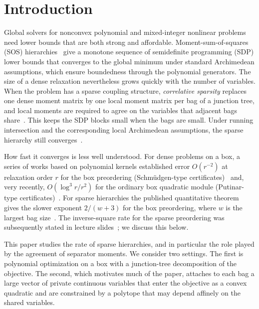 \section{Introduction}\label{sec:introduction}

Global solvers for nonconvex polynomial and mixed-integer nonlinear problems
need lower bounds that are both strong and affordable. Moment-sum-of-squares
(SOS) hierarchies~\cite{lasserre2001-global-optimization-with-polynomials-and,parrilo2003-semidefinite-programming-relaxations-for-semialgebraic}
give a monotone sequence of semidefinite programming (SDP) lower bounds that
converges to the global minimum under standard Archimedean assumptions,
which ensure boundedness through the polynomial generators. The size of a
dense relaxation nevertheless grows quickly with the number of variables.
When the problem has a sparse coupling structure, \emph{correlative sparsity} replaces one dense
moment matrix by one local moment matrix per bag of a junction tree, and
local moments are required to agree on the variables that adjacent bags
share~\cite{waki2006-sums-of-squares-and-semidefinite,lasserre2006-convergent-sdprelaxations-in-polynomial-optimization}.
This keeps the SDP blocks small when the bags are small. Under running
intersection and the corresponding local Archimedean assumptions, the sparse
hierarchy still converges~\cite{lasserre2006-convergent-sdprelaxations-in-polynomial-optimization,grimm2007-structured-sparsity}.

How fast it converges is less well understood. For dense problems on a
box, a series of works based on polynomial kernels established error
$O(r^{-2})$ at relaxation order $r$ for the box preordering (Schmüdgen-type
certificates)~\cite{laurent2023-effective-schmudgen} and, very recently,
$O(\log^3r/r^2)$ for the ordinary box quadratic module (Putinar-type
certificates)~\cite{gribling2026-squared-kernels}. For sparse hierarchies
the published quantitative theorem gives the slower exponent
$2/(w+3)$ for the box preordering, where $w$ is the largest bag
size~\cite{korda2025-convergence-rates-sparsity}. The inverse-square rate
for the sparse preordering was subsequently stated in lecture
slides~\cite{magron2025slides-lorentz,magron2026slides-tenors}; we discuss
this below.

This paper studies the rate of sparse hierarchies, and in particular the
role played by the agreement of separator moments. We consider two
settings. The first is polynomial optimization on a box with a
junction-tree decomposition of the objective. The second, which motivates
much of the paper, attaches to each bag a large vector of private
continuous variables that enter the objective as a convex quadratic and are
constrained by a polytope that may depend affinely on the shared variables.

